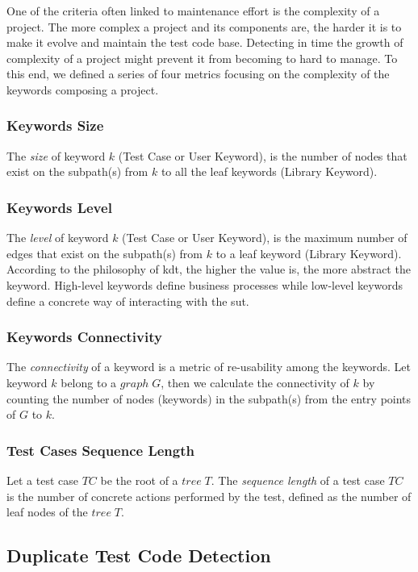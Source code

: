 One of the criteria often linked to maintenance effort is the complexity of a project. The more complex a project and its components are, the harder it is to make it evolve and maintain the test code base. Detecting in time the growth of complexity of a project might prevent it from becoming to hard to manage. To this end, we defined a series of four metrics focusing on the complexity of the keywords composing a project.

\subsubsection{Keywords Size} The \emph{size} of keyword $k$ (Test Case or User Keyword), is the number of nodes that exist on the subpath(s) from $k$ to all the leaf keywords (Library Keyword).

\subsubsection{Keywords Level} The \emph{level} of keyword $k$ (Test Case or User Keyword), is the maximum number of edges that exist on the subpath(s) from $k$ to a leaf keyword (Library Keyword). According to the philosophy of \gls{kdt}, the higher the value is, the more abstract the keyword. High-level keywords define business processes while low-level keywords define a concrete way of interacting with the \gls{sut}.

\subsubsection{Keywords Connectivity} The \emph{connectivity} of a keyword is a metric of re-usability among the keywords. Let keyword $k$ belong to a $graph\; G$, then we calculate the connectivity of $k$ by counting the number of nodes (keywords) in the subpath(s) from the entry points of $G$ to $k$.

\subsubsection{Test Cases Sequence Length} Let a test case $TC$ be the root of a $tree\; T$. The \emph{sequence length} of a test case $TC$ is the number of concrete actions performed by the test, defined as the number of leaf nodes of the $tree\; T$.

\subsection{Duplicate Test Code Detection}

